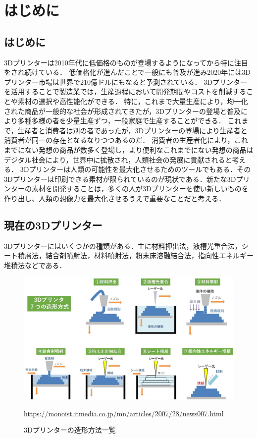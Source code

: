 \chapter{はじめに}
\label{chp:first}

\section{はじめに}
\label{sec:paragraph}

3Dプリンターは2010年代に低価格のものが登場するようになってから特に注目をされ続けている．
低価格化が進んだことで一般にも普及が進み2020年には3Dプリンター市場は世界で210億ドルにもなると予測されている．
3Dプリンターを活用することで製造業では，生産過程において開発期間やコストを削減することや素材の選択や高性能化ができる．
特に，これまで大量生産により，均一化された商品が一般的な社会が形成されてきたが，3Dプリンターの登場と普及により多種多様の者を少量生産ずつ，一般家庭で生産することができる．
これまで，生産者と消費者は別の者であったが，3Dプリンターの登場により生産者と消費者が同一の存在となるなりつつあるのだ． 消費者の生産者化により，これまでにない発想の商品が数多く登場し，より便利なこれまでにない発想の商品はデジタル社会により，世界中に拡散され，人類社会の発展に貢献されると考える．
3Dプリンターは人類の可能性を最大化させるためのツールでもある．その3Dプリンターは印刷できる素材が限られているのが現状である．新たな3Dプリンターの素材を開発することは，多くの人が3Dプリンターを使い新しいものを作り出し、人類の想像力を最大化させるうえで重要なことだと考える．


\section{現在の3Dプリンター}
\label{sec:paragraph}

3Dプリンターにはいくつかの種類がある．主に材料押出法，液槽光重合法，シート積層法，結合剤噴射法，材料噴射法，粉末床溶融結合法，指向性エネルギー堆積法などである．

\begin{figure}[H]
  \centering
  \includegraphics[width=12truecm]{./fig/3Dprinter.jpg}
  \caption{3Dプリンターの造形方法一覧}
  \url{https://monoist.itmedia.co.jp/mn/articles/2007/28/news007.html} %
  \label{fig:ゲル}
\end{figure}

